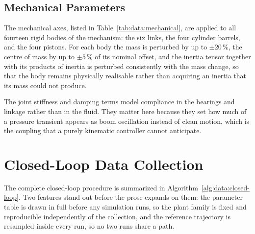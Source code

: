 \subsection{Mechanical Parameters}

The mechanical axes, listed in Table~\ref{tab:data:mechanical}, are
applied to all fourteen rigid bodies of the mechanism: the six links,
the four cylinder barrels, and the four pistons. For each body the mass
is perturbed by up to $\pm 20\,\%$, the centre of mass by up to
$\pm 5\,\%$ of its nominal offset, and the inertia tensor together with
its products of inertia is perturbed consistently with the mass change,
so that the body remains physically realisable rather than acquiring an
inertia that its mass could not produce.



The joint stiffness and damping terms model compliance in the bearings
and linkage rather than in the fluid. They matter here because they set
how much of a pressure transient appears as boom oscillation instead of
clean motion, which is the coupling that a purely kinematic
controller cannot anticipate.

\section{Closed-Loop Data Collection}
\label{sec:data:closed-loop}

The complete closed-loop procedure is summarized in
Algorithm~\ref{alg:data:closed-loop}. Two features stand out before the prose expands on them: the parameter table is
drawn in full before any simulation runs, so the plant family is fixed
and reproducible independently of the collection, and the reference
trajectory is resampled inside every run, so no two runs share a path.

